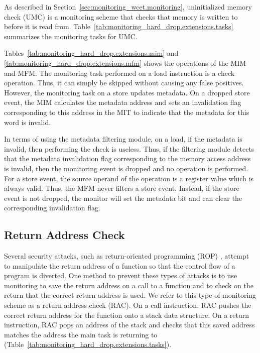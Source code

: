 As described in Section~\ref{sec:monitoring_wcet.monitoring},
uninitialized memory check (UMC) is a monitoring scheme that checks that memory
is written to before it is read from.
Table~\ref{tab:monitoring_hard_drop.extensions.tasks} summarizes the monitoring
tasks for UMC.

Tables~\ref{tab:monitoring_hard_drop.extensions.mim} and
\ref{tab:monitoring_hard_drop.extensions.mfm} shows the operations of
the MIM and MFM. The monitoring task performed on a load instruction is a check
operation.  Thus, it can simply be skipped without causing any false positives.
However, the monitoring task on a store updates metadata. On a dropped store
event, the MIM calculates the metadata address and sets an invalidation flag
corresponding to this address in the MIT to indicate that the metadata for this
word is invalid.

In terms of using the metadata filtering module, on a load, if the metadata is
invalid, then performing the check is useless. Thus, if the filtering module
detects that the metadata invalidation flag corresponding to the memory access
address is invalid, then the monitoring event is dropped and no operation is
performed.  For a store event, the source operand of the operation is a
register value which is always valid. Thus, the MFM never filters a store
event. Instead, if the store event is not dropped, the monitor will set the
metadata bit and can clear the corresponding invalidation flag.

\subsection{Return Address Check}
\label{sec:monitoring_hard_drop.extensions.lrc}

Several security attacks, such as return-oriented programming (ROP)
\cite{rop-ccs07}, attempt to manipulate the return address of a
function so that the control flow of a program is diverted. One method to
prevent these types of attacks is to use monitoring to save the return address
on a call to a function and to check on the return that the correct return
address is used. We refer to this type of monitoring scheme as a return address
check (RAC). On a call instruction, RAC pushes the correct return address for
the function onto a stack data structure. On a return instruction, RAC pops an
address of the stack and checks that this saved address matches the address the
main task is returning to (Table~\ref{tab:monitoring_hard_drop.extensions.tasks}).

